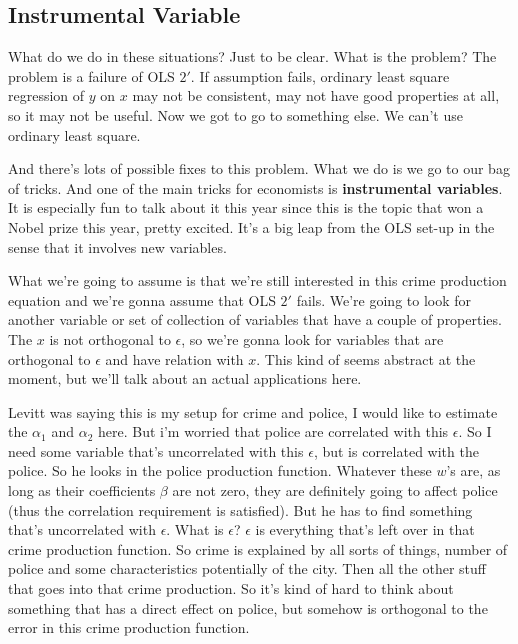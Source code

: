 \documentclass[11pt,a4paper]{amsart}
\theoremstyle{plain}
\theoremstyle{definition}
\begin{document}
\subsection{Instrumental Variable}
 		 What do we do in these situations? Just to be clear.  What is the problem? The problem is a failure of OLS $2'$. If assumption fails, ordinary least square regression of $y$ on $x$ may not be consistent, may not have good properties at all, so it may not be useful.  Now we got to go to something else. We can't use ordinary least square.\par 
 		 And there's lots of possible fixes to this problem. What we do is we go to our bag of tricks. And one of the main tricks for economists is \textbf{instrumental variables}. It is especially fun to talk about it this year since this is the topic that won a Nobel prize this year, pretty excited.  It's a big leap from the OLS set-up in the sense that it involves new variables.\par 
 		 What we're going to assume is that we're still interested in this crime production equation and we're gonna assume that OLS $2'$ fails. We're going to look for another variable or set of collection of variables that have a couple of properties. The $x$ is not orthogonal to $\epsilon$, so we're gonna look for variables that are orthogonal to $\epsilon$ and have relation with $x$. This kind of seems abstract at the moment, but we'll talk about an actual applications here.\par 
 		Levitt was saying this is my setup for crime and police, I would like to estimate the $\alpha_{1}$ and $\alpha_{2}$ here. But i'm worried that police are correlated with this $\epsilon$. So I need some variable that's uncorrelated with this $\epsilon$, but is correlated with the police. So he looks in the police production function. Whatever these $w$'s are, as long as their coefficients $\beta$ are not zero, they are definitely going to affect police (thus the correlation requirement is satisfied). But he has to find something that's uncorrelated with $\epsilon$. What is $\epsilon$? $\epsilon$ is everything that's left over in that crime production function. So crime is explained by all sorts of things, number of police and some characteristics potentially of the city. Then all the other stuff that goes into that crime production. So it's kind of hard to think about something that has a direct effect on police, but somehow is orthogonal to the error in this crime production function.\par 
\end{document}
